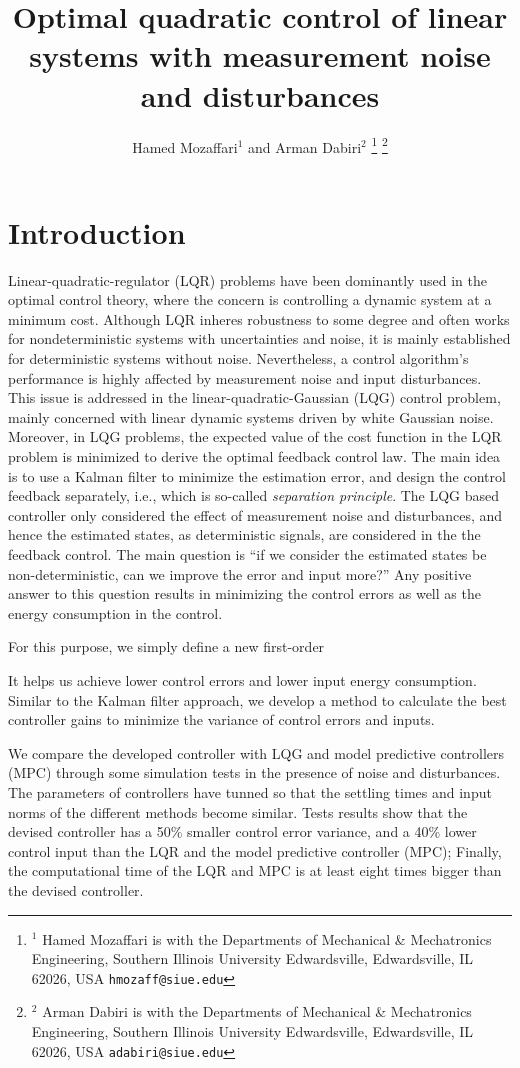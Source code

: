 \documentclass[letterpaper, 10 pt, conference]{ieeeconf} %
\date{}
\title{
	\LARGE \bf{
		Optimal quadratic control of linear systems with measurement noise and disturbances}
}
\author{Hamed Mozaffari$ ^{1} $ and Arman Dabiri$ ^{2} $
	\thanks{ $ ^{1} $ Hamed Mozaffari is with the Departments of Mechanical \& Mechatronics Engineering, Southern Illinois University Edwardsville, Edwardsville, IL 62026, USA {\tt\small hmozaff@siue.edu}}
	\thanks{ $ ^{2} $ Arman Dabiri is with the Departments of Mechanical \& Mechatronics Engineering, Southern Illinois University Edwardsville, Edwardsville, IL 62026, USA {\tt\small adabiri@siue.edu}}%
}
\begin{document}
\maketitle
\begin{abstract}
	
\end{abstract}

\vspace{.4cm}
\section{Introduction}
Linear-quadratic-regulator (LQR) problems have been dominantly used in the optimal control theory, where the concern is controlling a dynamic system at a minimum cost. Although LQR inheres robustness to some degree and often works for nondeterministic systems with uncertainties and noise, it is mainly established for deterministic systems without noise. Nevertheless, a control algorithm's performance is highly affected by measurement noise and input disturbances. This issue is addressed in the linear-quadratic-Gaussian (LQG) control problem, mainly concerned with linear dynamic systems driven by white Gaussian noise. Moreover, in LQG problems, the expected value of the cost function in the LQR problem is minimized to derive the optimal feedback control law. The main idea is to use a Kalman filter to minimize the estimation error, and design the control feedback separately, i.e., which is so-called  \emph{separation principle}. The LQG based controller only considered the effect of measurement noise and disturbances, and hence the estimated states, as deterministic signals, are considered in the the feedback control. The main question is ``if we consider the estimated states be non-deterministic, can we improve the error and input more?'' Any positive answer to this question results in minimizing the control errors as well as the energy consumption in the control.

For this purpose, we simply define a new first-order 


It helps us achieve lower control errors and lower input energy consumption. Similar to the Kalman filter approach, we develop a method to calculate the best controller gains to minimize the variance of control errors and inputs.  


We compare the developed controller with LQG and model predictive controllers (MPC) through some simulation tests in the presence of noise and disturbances. The parameters of controllers have tunned so that the settling times and input norms of the different methods become similar. Tests results show that the devised controller has a 50\% smaller control error variance, and a 40\% lower control input  than the LQR and the model predictive controller (MPC); Finally, the computational time of the LQR and MPC is at least eight times bigger than the devised controller.  
\end{document}
